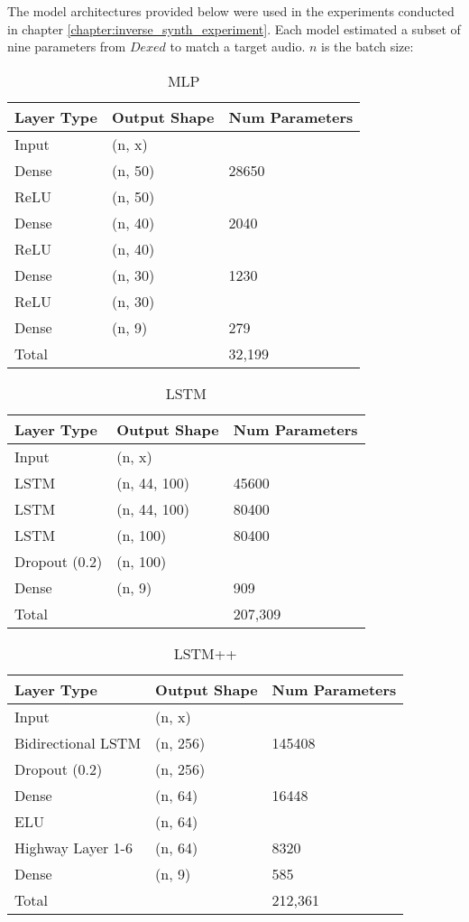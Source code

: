 \label{appendix:spiegelib_models}

The model architectures provided below were used in the experiments conducted in chapter \ref{chapter:inverse_synth_experiment}. Each model estimated a subset of nine parameters from $Dexed$ to match a target audio. $n$ is the batch size:

\begin{table}[ht]
\caption{MLP}
\centering
\begin{tabular}{l|l|l}
Layer Type & Output Shape & Num Parameters \\ \hline
Input & (n, x) & \\
Dense & (n, 50) & 28650\\
ReLU    & (n, 50) &\\
Dense & (n, 40) & 2040\\
ReLU    & (n, 40) &  \\
Dense & (n, 30) & 1230 \\
ReLU    & (n, 30) & \\
Dense   & (n, 9) & 279\\
\hline
\hline
Total   & \ & 32,199\\
\end{tabular}
\end{table}

\begin{table}[ht]
\caption{LSTM}
\centering
\begin{tabular}{l|l|l}
Layer Type & Output Shape & Num Parameters \\ \hline
Input & (n, x) & \\
LSTM & (n, 44, 100) & 45600\\
LSTM & (n, 44, 100) & 80400\\
LSTM & (n, 100) & 80400\\
Dropout (0.2) & (n, 100) & \\
Dense   & (n, 9) & 909\\
\hline
\hline
Total   & \ & 207,309\\
\end{tabular}
\end{table}

\begin{table}[ht]
\caption{LSTM++}
\centering
\begin{tabular}{l|l|l}
Layer Type & Output Shape & Num Parameters \\ \hline
Input & (n, x) & \\
Bidirectional LSTM & (n, 256) & 145408\\
Dropout (0.2) & (n, 256) & \\
Dense & (n, 64) & 16448\\
ELU & (n, 64) &\\
Highway Layer 1-6 & (n, 64) & 8320\\
Dense   & (n, 9) & 585\\
\hline
\hline
Total   & \ & 212,361\\
\end{tabular}
\end{table}


